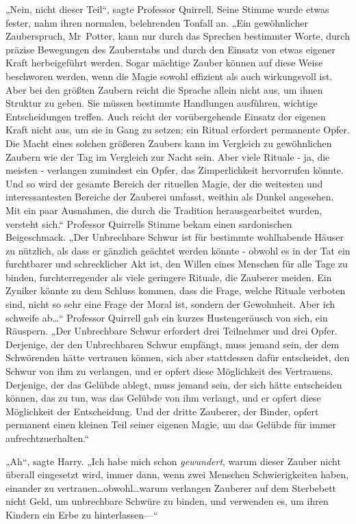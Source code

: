 {„Nein, nicht dieser Teil“, sagte Professor Quirrell. Seine Stimme wurde etwas fester, nahm ihren normalen, belehrenden Tonfall an. „Ein gewöhnlicher Zauberspruch, Mr~Potter, kann nur durch das Sprechen bestimmter Worte, durch präzise Bewegungen des Zauberstabs und durch den Einsatz von etwas eigener Kraft herbeigeführt werden. Sogar mächtige Zauber können auf diese Weise beschworen werden, wenn die Magie sowohl effizient als auch wirkungsvoll ist. Aber bei den größten Zaubern reicht die Sprache allein nicht aus, um ihnen Struktur zu geben. Sie müssen bestimmte Handlungen ausführen, wichtige Entscheidungen treffen. Auch reicht der vorübergehende Einsatz der eigenen Kraft nicht aus, um sie in Gang zu setzen; ein Ritual erfordert permanente Opfer. Die Macht eines solchen größeren Zaubers kann im Vergleich zu gewöhnlichen Zaubern wie der Tag im Vergleich zur Nacht sein. Aber viele Rituale - ja, die meisten - verlangen zumindest ein Opfer, das Zimperlichkeit hervorrufen könnte. Und so wird der gesamte Bereich der rituellen Magie, der die weitesten und interessantesten Bereiche der Zauberei umfasst, weithin als Dunkel angesehen. Mit ein paar Ausnahmen, die durch die Tradition herausgearbeitet wurden, versteht sich.“ Professor Quirrells Stimme bekam einen sardonischen Beigeschmack. „Der Unbrechbare Schwur ist für bestimmte wohlhabende Häuser zu nützlich, als dass er gänzlich geächtet werden könnte - obwohl es in der Tat ein furchtbarer und schrecklicher Akt ist, den Willen eines Menschen für alle Tage zu binden, furchterregender als viele geringere Rituale, die Zauberer meiden. Ein Zyniker könnte zu dem Schluss kommen, dass die Frage, welche Rituale verboten sind, nicht so sehr eine Frage der Moral ist, sondern der Gewohnheit. Aber ich schweife ab…“ Professor Quirrell gab ein kurzes Hustengeräusch von sich, ein Räuspern. „Der Unbrechbare Schwur erfordert drei Teilnehmer und drei Opfer. Derjenige, der den Unbrechbaren Schwur empfängt, muss jemand sein, der dem Schwörenden hätte vertrauen können, sich aber stattdessen dafür entscheidet, den Schwur von ihm zu verlangen, und er opfert diese Möglichkeit des Vertrauens. Derjenige, der das Gelübde ablegt, muss jemand sein, der sich hätte entscheiden können, das zu tun, was das Gelübde von ihm verlangt, und er opfert diese Möglichkeit der Entscheidung. Und der dritte Zauberer, der Binder, opfert permanent einen kleinen Teil seiner eigenen Magie, um das Gelübde für immer aufrechtzuerhalten.“

„Ah“, sagte Harry. „Ich habe mich schon \emph{gewundert}, warum dieser Zauber nicht überall eingesetzt wird, immer dann, wenn zwei Menschen Schwierigkeiten haben, einander zu vertrauen…obwohl…warum verlangen Zauberer auf dem Sterbebett nicht Geld, um unbrechbare Schwüre zu binden, und verwenden es, um ihren Kindern ein Erbe zu hinterlassen—“

}
